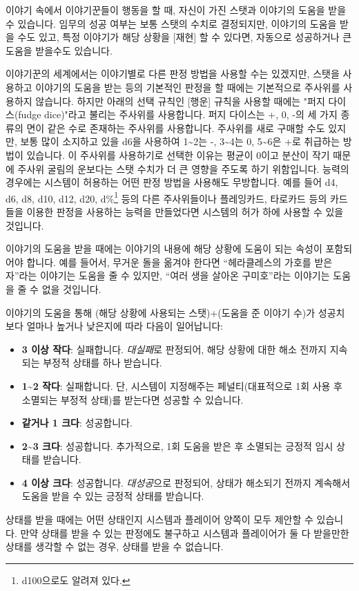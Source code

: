 \documentclass[12pt]{report}
\begin{document}
	이야기 속에서 이야기꾼들이 행동을 할 때, 자신이 가진 스탯과 이야기의 도움을 받을 수 있습니다. 임무의 성공 여부는 보통 스탯의 수치로 결정되지만, 이야기의 도움을 받을 수도 있고, 특정 이야기가 해당 상황을 [재현] 할 수 있다면, 자동으로 성공하거나 큰 도움을 받을수도 있습니다.
	
	\bigskip
	
	이야기꾼의 세계에서는 이야기별로 다른 판정 방법을 사용할 수는 있겠지만, 스탯을 사용하고 이야기의 도움을 받는 등의 기본적인 판정을 할 때에는 기본적으로 주사위를 사용하지 않습니다. 하지만 아래의 선택 규칙인 [행운] 규칙을 사용할 때에는 "퍼지 다이스(fudge dice)"라고 불리는 주사위를 사용합니다. 퍼지 다이스는 +, 0, -의 세 가지 종류의 면이 같은 수로 존재하는 주사위를 사용합니다. 주사위를 새로 구매할 수도 있지만, 보통 많이 소지하고 있을 d6을 사용하여 1\textasciitilde2는 -, 3\textasciitilde4는 0, 5\textasciitilde6은 +로 취급하는 방법이 있습니다. 이 주사위를 사용하기로 선택한 이유는 평균이 0이고 분산이 작기 때문에 주사위 굴림의 운보다는 스탯 수치가 더 큰 영향을 주도록 하기 위함입니다. 능력의 경우에는 시스템이 허용하는 어떤 판정 방법을 사용해도 무방합니다. 예를 들어 d4, d6, d8, d10, d12, d20, d\%\footnote{d100으로도 알려져 있다.} 등의 다른 주사위들이나 플레잉카드, 타로카드 등의 카드들을 이용한 판정을 사용하는 능력을 만들었다면 시스템의 허가 하에 사용할 수 있을 것입니다.
	
	\bigskip
	
	이야기의 도움을 받을 때에는 이야기의 내용에 해당 상황에 도움이 되는 속성이 포함되어야 합니다. 예를 들어서, 무거운 돌을 옮겨야 한다면 “헤라클레스의 가호를 받은 자”라는 이야기는 도움을 줄 수 있지만, “여러 생을 살아온 구미호”라는 이야기는 도움을 줄 수 없을 것입니다.
	
	이야기의 도움을 통해 (해당 상황에 사용되는 스탯)+(도움을 준 이야기 수)가 성공치보다 얼마나 높거나 낮은지에 따라 다음이 일어납니다:
	\begin{itemize}
		\item \textbf{3 이상 작다}: 실패합니다. \emph{대실패}로 판정되어, 해당 상황에 대한 해소 전까지 지속되는 부정적 상태를 하나 받습니다.
		\item \textbf{1\textasciitilde2 작다}: 실패합니다. 단, 시스템이 지정해주는 페널티(대표적으로 1회 사용 후 소멸되는 부정적 상태)를 받는다면 성공할 수 있습니다.
		\item \textbf{같거나 1 크다}: 성공합니다.
		\item \textbf{2\textasciitilde3 크다}: 성공합니다. 추가적으로, 1회 도움을 받은 후 소멸되는 긍정적 임시 상태를 받습니다.
		\item \textbf{4 이상 크다}: 성공합니다. \emph{대성공}으로 판정되어, 상태가 해소되기 전까지 계속해서 도움을 받을 수 있는 긍정적 상태를 받습니다.
	\end{itemize}
	상태를 받을 때에는 어떤 상태인지 시스템과 플레이어 양쪽이 모두 제안할 수 있습니다. 만약 상태를 받을 수 있는 판정에도 불구하고 시스템과 플레이어가 둘 다 받을만한 상태를 생각할 수 없는 경우, 상태를 받을 수 없습니다.
	
\end{document}
